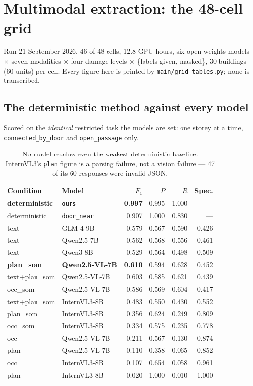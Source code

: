 \documentclass[11pt,a4paper]{article}
\newcommand{\code}[1]{\texttt{\small #1}}
\begin{document}
\section{Multimodal extraction: the 48-cell grid}

Run 21 September 2026. 46 of 48 cells, 12.8 GPU-hours, six open-weights models
$\times$ seven modalities $\times$ four damage levels $\times$ \{labels given,
masked\}, 30 buildings (60 units) per cell. Every figure here is printed by
\code{main/grid\_tables.py}; none is transcribed.

\subsection{The deterministic method against every model}

Scored on the \emph{identical} restricted task the models are set: one storey
at a time, \code{connected\_by\_door} and \code{open\_passage} only.

\begin{table}[ht]
\centering
\small
\begin{tabular}{llrrrr}
\toprule
Condition & Model & $F_1$ & $P$ & $R$ & Spec. \\
\midrule
\textbf{deterministic} & \textbf{\code{ours}} & \textbf{0.997} & 0.995 & 1.000 & --- \\
deterministic & \code{door\_near} & 0.907 & 1.000 & 0.830 & --- \\
\midrule
text & GLM-4-9B & 0.579 & 0.567 & 0.590 & 0.426 \\
text & Qwen2.5-7B & 0.562 & 0.568 & 0.556 & 0.461 \\
text & Qwen3-8B & 0.529 & 0.564 & 0.498 & 0.509 \\
\midrule
\textbf{plan\_som} & \textbf{Qwen2.5-VL-7B} & \textbf{0.610} & 0.594 & 0.628 & 0.452 \\
text+plan\_som & Qwen2.5-VL-7B & 0.603 & 0.585 & 0.621 & 0.439 \\
occ\_som & Qwen2.5-VL-7B & 0.586 & 0.569 & 0.604 & 0.417 \\
text+plan\_som & InternVL3-8B & 0.483 & 0.550 & 0.430 & 0.552 \\
plan\_som & InternVL3-8B & 0.356 & 0.624 & 0.249 & 0.809 \\
occ\_som & InternVL3-8B & 0.334 & 0.575 & 0.235 & 0.778 \\
\midrule
occ & Qwen2.5-VL-7B & 0.211 & 0.567 & 0.130 & 0.874 \\
plan & Qwen2.5-VL-7B & 0.110 & 0.358 & 0.065 & 0.852 \\
occ & InternVL3-8B & 0.107 & 0.654 & 0.058 & 0.961 \\
plan & InternVL3-8B & 0.020 & 1.000 & 0.010 & 1.000 \\
\bottomrule
\end{tabular}
\caption{No model reaches even the weakest deterministic baseline. InternVL3's
\code{plan} figure is a parsing failure, not a vision failure --- 47 of its 60
responses were invalid JSON.}
\end{table}
\end{document}
